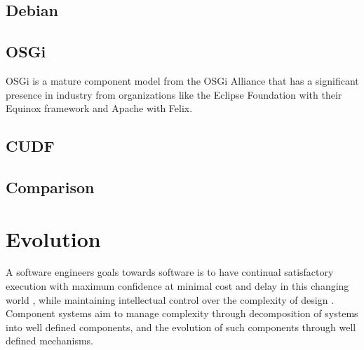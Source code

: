 



\subsection{Debian}



\subsection{OSGi}
{}OSGi is a mature component model from the OSGi Alliance that has a significant presence in industry \cite{Kriens2008} 
{}from organizations like the Eclipse Foundation with their Equinox framework and Apache with Felix.

\subsection{CUDF}

\subsection{Comparison}

\section{Evolution}
{}A software engineers goals towards software is to have continual satisfactory execution with maximum confidence at minimal cost and delay in this changing world \cite{Lehman2006}, 
{}while maintaining intellectual control over the complexity of design \cite{Brooks1975}.
{}Component systems aim to manage complexity through decomposition of systems into well defined components, and the evolution of such components through well defined mechanisms.

